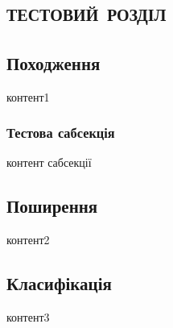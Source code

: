 \newpage

\chapter{\textsc{тестовий розділ}}

\section{Походження}
контент1
\subsection{Тестова сабсекція}
контент сабсекції
\section{Поширення}
контент2
\section{Класифікація}
контент3
